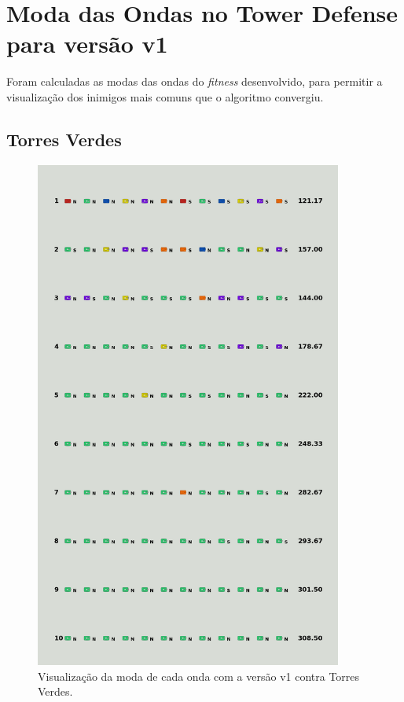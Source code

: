 \chapter{Moda das Ondas no Tower Defense para versão v1}
\label{sec:apend-moda-td-v1}

Foram calculadas as modas das ondas do \textit{fitness} desenvolvido, para permitir a visualização dos inimigos mais comuns que o algoritmo convergiu.

\section{Torres Verdes}
\label{sec:apend-moda-td-g-v1}

\begin{figure}[H]
  \centering
  \includegraphics[width=0.9\textwidth]{figuras/td/td_allgreen_ai_mode_1_1.png}
  \caption{Visualização da moda de cada onda com a versão v1 contra Torres Verdes.}
  \label{fig:td-moda-green-1-1}
\end{figure}

